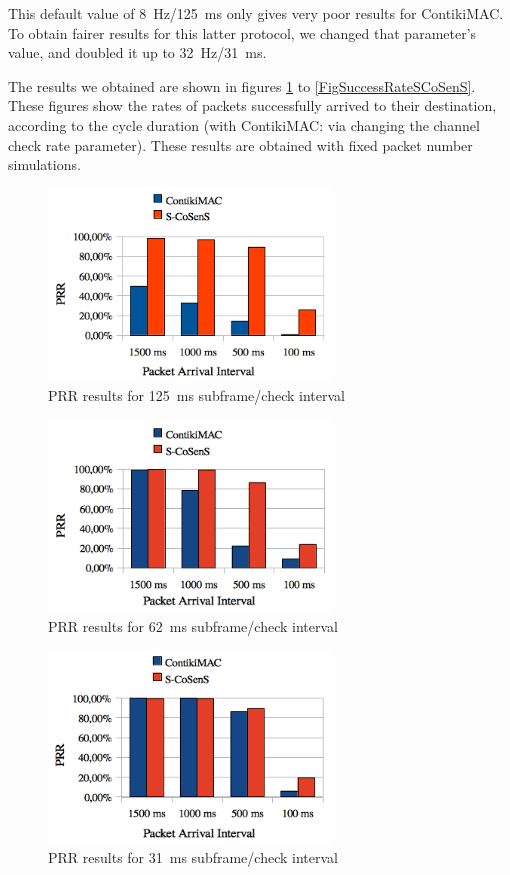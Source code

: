 \documentclass[conference]{IEEEtran}
\begin{document}
This default value of 8~Hz/125~ms only gives very poor results for ContikiMAC.
To obtain fairer results for this latter protocol, we changed that
parameter's value, and doubled it up to 32~Hz/31~ms.

The results we obtained are shown in figures \ref{FigSuccessRate8Hz} to
\ref{FigSuccessRateSCoSenS}. These figures show the rates of packets
successfully arrived to their destination, according to the cycle
duration (with ContikiMAC: via changing the channel check rate parameter).
These results are obtained with fixed packet number simulations.

\begin{figure}[tbph]
  \centering
  \includegraphics[width=7.5cm]{graphes/PRR8Hz.png}
  \caption{PRR results for 125~ms subframe/check interval}
  \label{FigSuccessRate8Hz}
\end{figure}
\begin{figure}[tbph]
  \centering
  \includegraphics[width=7.5cm]{graphes/PRR16Hz.png}
  \caption{PRR results for 62~ms subframe/check interval}
  \label{FigSuccessRate16Hz}
\end{figure}
\begin{figure}[tbph]
  \centering
  \includegraphics[width=7.5cm]{graphes/PRR32Hz.png}
  \caption{PRR results for 31~ms subframe/check interval}
  \label{FigSuccessRate32Hz}
\end{figure}
\end{document}
